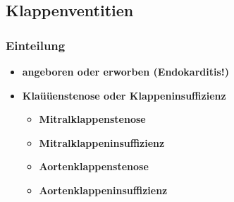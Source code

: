 	\subsection*{Klappenventitien}
		\subsubsection*{Einteilung}
			\begin{itemize}
				\item \textbf{angeboren oder erworben (Endokarditis!)}
				\item \textbf{Klaüüenstenose oder Klappeninsuffizienz}
					\begin{itemize}
						\item \textbf{Mitralklappenstenose}
						\item \textbf{Mitralklappeninsuffizienz}
						\item \textbf{Aortenklappenstenose}
						\item \textbf{Aortenklappeninsuffizienz} 
					\end{itemize}
			\end{itemize}